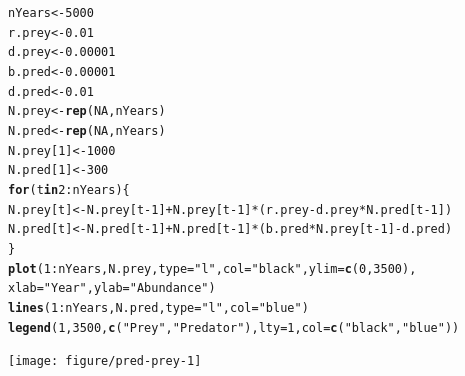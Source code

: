 \documentclass[12pt]{article}\usepackage[]{graphicx}\usepackage[]{color}
\makeatletter
\newcommand{\hlnum}[1]{\textcolor[rgb]{0.686,0.059,0.569}{#1}}%
\newcommand{\hlstr}[1]{\textcolor[rgb]{0.192,0.494,0.8}{#1}}%
\newcommand{\hlopt}[1]{\textcolor[rgb]{0,0,0}{#1}}%
\newcommand{\hlstd}[1]{\textcolor[rgb]{0.345,0.345,0.345}{#1}}%
\newcommand{\hlkwa}[1]{\textcolor[rgb]{0.161,0.373,0.58}{\textbf{#1}}}%
\newcommand{\hlkwb}[1]{\textcolor[rgb]{0.69,0.353,0.396}{#1}}%
\newcommand{\hlkwc}[1]{\textcolor[rgb]{0.333,0.667,0.333}{#1}}%
\newcommand{\hlkwd}[1]{\textcolor[rgb]{0.737,0.353,0.396}{\textbf{#1}}}%
\newenvironment{kframe}{%
 \def\at@end@of@kframe{}%
 \ifinner\ifhmode%
  \def\at@end@of@kframe{\end{minipage}}%
  \begin{minipage}{\columnwidth}%
 \fi\fi%
 \def\FrameCommand##1{\hskip\@totalleftmargin \hskip-\fboxsep
 \colorbox{shadecolor}{##1}\hskip-\fboxsep
     \hskip-\linewidth \hskip-\@totalleftmargin \hskip\columnwidth}%
 \MakeFramed {\advance\hsize-\width
   \@totalleftmargin\z@ \linewidth\hsize
   \@setminipage}}%
 {\par\unskip\endMakeFramed%
 \at@end@of@kframe}
\newenvironment{knitrout}{}{} %
\makeatother
\begin{document}
\begin{knitrout}
\color{fgcolor}\begin{kframe}
\begin{alltt}
\hlstd{nYears} \hlkwb{<-} \hlnum{5000}
\hlstd{r.prey} \hlkwb{<-} \hlnum{0.01}
\hlstd{d.prey} \hlkwb{<-} \hlnum{0.00001}
\hlstd{b.pred} \hlkwb{<-} \hlnum{0.00001}
\hlstd{d.pred} \hlkwb{<-} \hlnum{0.01}
\hlstd{N.prey} \hlkwb{<-} \hlkwd{rep}\hlstd{(}\hlnum{NA}\hlstd{, nYears)}
\hlstd{N.pred} \hlkwb{<-} \hlkwd{rep}\hlstd{(}\hlnum{NA}\hlstd{, nYears)}
\hlstd{N.prey[}\hlnum{1}\hlstd{]} \hlkwb{<-} \hlnum{1000}
\hlstd{N.pred[}\hlnum{1}\hlstd{]} \hlkwb{<-} \hlnum{300}
\hlkwa{for}\hlstd{(t} \hlkwa{in} \hlnum{2}\hlopt{:}\hlstd{nYears) \{}
    \hlstd{N.prey[t]} \hlkwb{<-} \hlstd{N.prey[t}\hlopt{-}\hlnum{1}\hlstd{]} \hlopt{+} \hlstd{N.prey[t}\hlopt{-}\hlnum{1}\hlstd{]}\hlopt{*}\hlstd{(r.prey}\hlopt{-}\hlstd{d.prey}\hlopt{*}\hlstd{N.pred[t}\hlopt{-}\hlnum{1}\hlstd{])}
    \hlstd{N.pred[t]} \hlkwb{<-} \hlstd{N.pred[t}\hlopt{-}\hlnum{1}\hlstd{]} \hlopt{+} \hlstd{N.pred[t}\hlopt{-}\hlnum{1}\hlstd{]}\hlopt{*}\hlstd{(b.pred}\hlopt{*}\hlstd{N.prey[t}\hlopt{-}\hlnum{1}\hlstd{]} \hlopt{-} \hlstd{d.pred)}
\hlstd{\}}
\hlkwd{plot}\hlstd{(}\hlnum{1}\hlopt{:}\hlstd{nYears, N.prey,} \hlkwc{type}\hlstd{=}\hlstr{"l"}\hlstd{,} \hlkwc{col}\hlstd{=}\hlstr{"black"}\hlstd{,} \hlkwc{ylim}\hlstd{=}\hlkwd{c}\hlstd{(}\hlnum{0}\hlstd{,} \hlnum{3500}\hlstd{),}
     \hlkwc{xlab}\hlstd{=}\hlstr{"Year"}\hlstd{,} \hlkwc{ylab}\hlstd{=}\hlstr{"Abundance"}\hlstd{)}
\hlkwd{lines}\hlstd{(}\hlnum{1}\hlopt{:}\hlstd{nYears, N.pred,} \hlkwc{type}\hlstd{=}\hlstr{"l"}\hlstd{,} \hlkwc{col}\hlstd{=}\hlstr{"blue"}\hlstd{)}
\hlkwd{legend}\hlstd{(}\hlnum{1}\hlstd{,} \hlnum{3500}\hlstd{,} \hlkwd{c}\hlstd{(}\hlstr{"Prey"}\hlstd{,} \hlstr{"Predator"}\hlstd{),} \hlkwc{lty}\hlstd{=}\hlnum{1}\hlstd{,} \hlkwc{col}\hlstd{=}\hlkwd{c}\hlstd{(}\hlstr{"black"}\hlstd{,} \hlstr{"blue"}\hlstd{))}
\end{alltt}
\end{kframe}

{\centering \texttt{[image: figure/pred-prey-1]} 

}



\end{knitrout}
\end{document}
